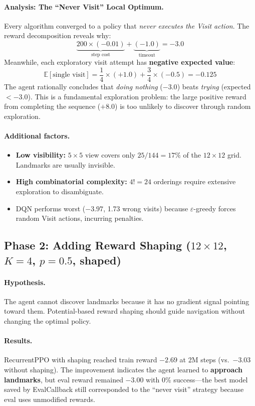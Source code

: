 \documentclass[11pt,a4paper]{article}
\begin{document}
\paragraph{Analysis: The ``Never Visit'' Local Optimum.}
Every algorithm converged to a policy that \emph{never executes the Visit
action}. The reward decomposition reveals why:
\[
  \underbrace{200 \times (-0.01)}_{\text{step cost}} + \underbrace{(-1.0)}_{\text{timeout}} = -3.0
\]
Meanwhile, each exploratory visit attempt has \textbf{negative expected value}:
\[
  \mathbb{E}[\text{single visit}] = \frac{1}{4} \times (+1.0) + \frac{3}{4} \times (-0.5) = -0.125
\]
The agent rationally concludes that \emph{doing nothing} ($-3.0$) beats
\emph{trying} (expected $< -3.0$). This is a fundamental exploration problem:
the large positive reward from completing the sequence ($+8.0$) is too
unlikely to discover through random exploration.

\paragraph{Additional factors.}
\begin{itemize}[nosep]
  \item \textbf{Low visibility:} $5\times5$ view covers only $25/144 = 17\%$ of
        the $12\times12$ grid. Landmarks are usually invisible.
  \item \textbf{High combinatorial complexity:} $4! = 24$ orderings require
        extensive exploration to disambiguate.
  \item DQN performs worst ($-3.97$, 1.73 wrong visits) because $\varepsilon$-greedy
        forces random Visit actions, incurring penalties.
\end{itemize}

\subsection{Phase 2: Adding Reward Shaping ($12\times12$, $K\!=\!4$, $p\!=\!0.5$, shaped)}

\paragraph{Hypothesis.} The agent cannot discover landmarks because it has no
gradient signal pointing toward them. Potential-based reward shaping should
guide navigation without changing the optimal policy.

\paragraph{Results.} RecurrentPPO with shaping reached train reward $-2.69$
at 2M steps (vs.\ $-3.03$ without shaping). The improvement indicates the
agent learned to \textbf{approach landmarks}, but eval reward remained $-3.00$
with 0\% success---the best model saved by EvalCallback still corresponded to
the ``never visit'' strategy because eval uses unmodified rewards.
\end{document}
